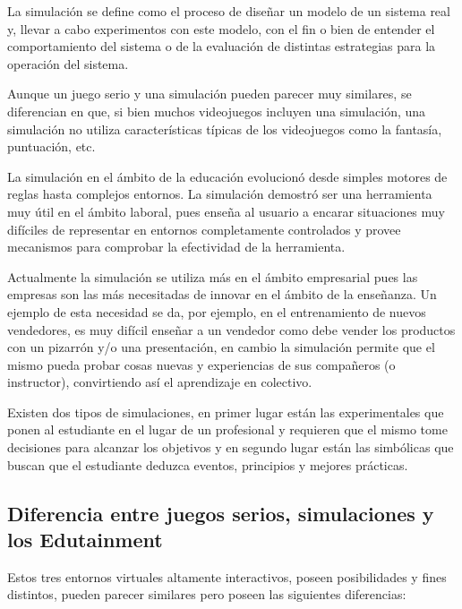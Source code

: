 La simulación se define como el proceso de diseñar un modelo de un sistema real
y, llevar a cabo experimentos con este modelo, con el fin o bien de entender el
comportamiento del sistema o de la evaluación de distintas estrategias para la
operación del sistema\cite{ingalls2008introduction}. 

Aunque un juego serio y una simulación pueden parecer muy similares, se
diferencian en que, si bien muchos videojuegos incluyen una simulación, una
simulación no utiliza características típicas de los videojuegos como la fantasía,
puntuación, etc\cite{sg:aoverview}.

La simulación en el ámbito de la educación evolucionó desde simples motores de
reglas hasta complejos entornos. La simulación demostró ser una herramienta muy
útil en el ámbito laboral\cite{mariluz:seiousgames}, pues enseña al usuario a
encarar situaciones muy difíciles de representar en entornos completamente
controlados y provee mecanismos para comprobar la efectividad de la herramienta. 

Actualmente la simulación se utiliza más en el ámbito empresarial pues las
empresas son las más necesitadas de innovar en el ámbito de la enseñanza. Un
ejemplo de esta necesidad se da, por ejemplo, en el entrenamiento de nuevos
vendedores, es muy difícil enseñar a un vendedor como debe vender los productos
con un pizarrón y/o una presentación, en cambio la simulación permite que el
mismo pueda probar cosas nuevas y experiencias de sus compañeros (o instructor),
convirtiendo así el aprendizaje en colectivo\cite{mariluz:seiousgames}.

Existen dos tipos de simulaciones, en primer lugar están las experimentales que
ponen al estudiante en el lugar de un profesional y requieren que el mismo tome
decisiones para alcanzar los objetivos y en segundo lugar están las simbólicas
que buscan que el estudiante deduzca eventos, principios y mejores
prácticas\cite{charsky:2010}. 


\subsection{Diferencia entre juegos serios, simulaciones y los Edutainment}

Estos tres entornos virtuales altamente interactivos, poseen posibilidades y
fines distintos, pueden parecer similares pero poseen las siguientes
diferencias\cite{education:games}:

